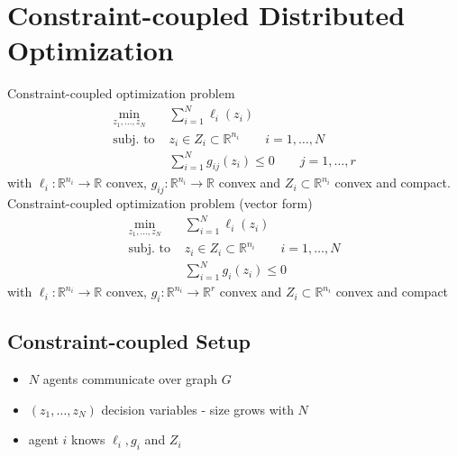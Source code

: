 \documentclass{book}
\newcommand{\R}{\mathbb{R}}
\theoremstyle{theoremv2}
\theoremstyle{defv2}
\theoremstyle{remark}
\theoremstyle{remark}
\theoremstyle{definition}
\theoremstyle{definition}
\begin{document}
\chapter{Constraint-coupled Distributed Optimization}
Constraint-coupled optimization problem 
\begin{align*}
    \min_{z_1,\dots,z_N} & \displaystyle\sum_{i=1}^{N}\ell_i(z_i)\\
    \text{subj. to } & z_i\in Z_i \subset \R^{n_i}  \qquad  i=1,\dots,N \\
                     & \displaystyle\sum_{i=1}^{N}g_{ij}(z_i)\leq 0 \qquad j=1,\dots,r
\end{align*}
with $\ell_i:\R^{n_i}\to \R$ convex, $g_{ij}:\R^{n_i}\to\R$ convex and $Z_i\subset \R^{n_i}$ convex and compact.
\bigskip
\\Constraint-coupled optimization problem (vector form)
\begin{align*}
    \min_{z_1,\dots,z_N} & \displaystyle\sum_{i=1}^{N}\ell_i(z_i)\\
    \text{subj. to } & z_i\in Z_i \subset \R^{n_i}  \qquad  i=1,\dots,N \\
                     & \displaystyle\sum_{i=1}^{N}g_{i}(z_i)\leq 0 
\end{align*}
with $\ell_i:\R^{n_i}\to \R$ convex, $g_{i}:\R^{n_i}\to\R^r$ convex and $Z_i\subset \R^{n_i}$ convex and compact

\section{Constraint-coupled Setup}
\begin{itemize}
    \item $N$ agents communicate over graph $G$
    \item $(z_1,\dots,z_N)$ decision variables - size grows with $N$
    \item agent $i$ knows $\ell_i,g_i$ and $Z_i$
\end{itemize}
\end{document}
